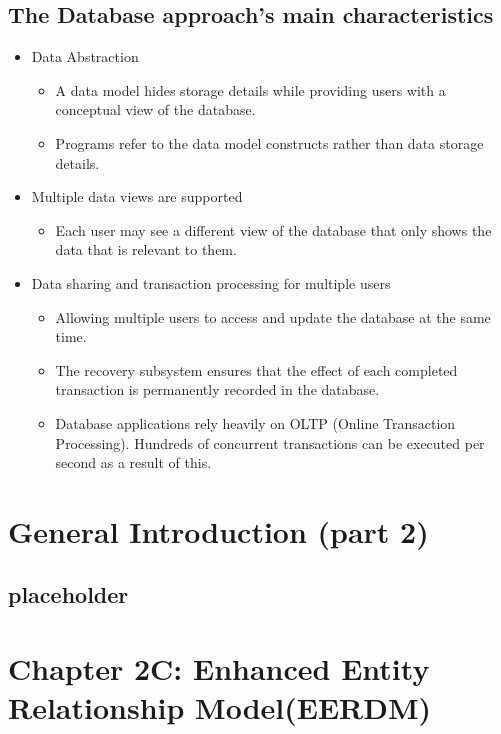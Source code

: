\documentclass[a4paper, 12pt]{article}
\begin{document}
    \subsection{The Database approach's main characteristics}
    \begin{itemize}
        \item Data Abstraction
            \begin{itemize}
                \item A data model hides storage details while providing users with a conceptual view of the database.
                \item Programs refer to the data model constructs rather than data storage details.
            \end{itemize}
        \item Multiple data views are supported
            \begin{itemize}
                \item Each user may see a different view of the database that only shows the data that is relevant to them.
            \end{itemize}
        \item Data sharing and transaction processing for multiple users
            \begin{itemize}
                \item Allowing multiple users to access and update the database at the same time.
                \item The recovery subsystem ensures that the effect of each completed transaction is permanently recorded in the database.
                \item Database applications rely heavily on OLTP (Online Transaction Processing). 
                Hundreds of concurrent transactions can be executed per second as a result of this.                
            \end{itemize}
    \end{itemize}

\newpage
\section{General Introduction (part 2)}
    \subsection{placeholder}

  
\newpage
\section{Chapter 2C: Enhanced Entity Relationship Model(EERDM)}
\end{document}
